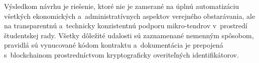 Výsledkom návrhu je riešenie, ktoré nie je zamerané na úplnú automatizáciu
všetkých ekonomických a~administratívnych aspektov verejného obstarávania,
ale na transparentnú a~technicky konzistentnú podporu mikro-tendrov
v~prostredí študentskej rady. Všetky dôležité udalosti sú zaznamenané
nemenným spôsobom, pravidlá sú vynucované kódom kontraktu a~dokumentácia
je prepojená s~blockchainom prostredníctvom kryptograficky overiteľných
identifikátorov.
